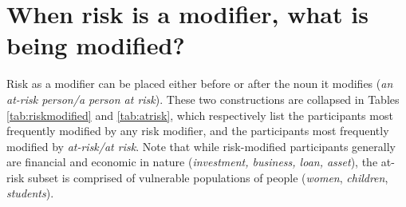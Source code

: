 




			\section{When risk is a modifier, what is being modified?}
			\FloatBarrier

			Risk as a modifier can be placed either before or after the noun it modifies (\emph{an at-risk person\slash a person at risk}). These two constructions are collapsed in Tables \ref{tab:riskmodified} and \ref{tab:atrisk}, which respectively list the participants most frequently modified by any risk modifier, and the participants most frequently modified by \emph{at-risk\slash at risk}. Note that while risk-modified participants generally are financial and economic in nature (\emph{investment, business, loan, asset}), the at-risk subset is comprised of vulnerable populations of people (\emph{women}, \emph{children}, \emph{students}).


